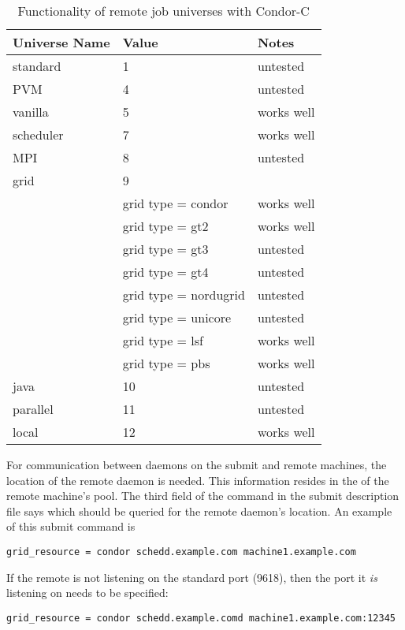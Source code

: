 \begin{center}
\begin{table}[hbt]
\begin{tabular}{|l|l|l}
\textbf{Universe Name} & \textbf{Value} & \textbf{Notes}\\ \hline \hline
standard  & 1 & untested \\ \hline
PVM       & 4 & untested \\ \hline
vanilla   & 5 & works well \\ \hline
scheduler & 7 & works well \\ \hline
MPI       & 8 & untested \\ \hline
grid      & 9 & \\
 & grid type = condor & works well \\
 & grid type = gt2  & works well \\
 & grid type = gt3 & untested \\
 & grid type = gt4 & untested \\ 
 & grid type = nordugrid & untested \\ 
 & grid type = unicore & untested \\
 & grid type = lsf & works well \\
 & grid type = pbs & works well \\ \hline
java & 10 & untested \\ \hline
parallel & 11 & untested \\ \hline
local & 12 & works well \\ \hline
\end{tabular}
\caption{\label{working-remote-universes}Functionality of remote job universes with Condor-C}
\end{table}
\end{center}

For communication between  daemons on the submit
and remote machines,
the location of the remote  daemon is needed.
This information resides in the  of the remote
machine's pool.
The third field of the  command in the submit description file
says which  should be queried for the remote 
daemon's location.
An example of this submit command is
\footnotesize
\begin{verbatim}
grid_resource = condor schedd.example.com machine1.example.com
\end{verbatim}
\normalsize
If the remote  is not listening on the standard port
(9618), then the port it \emph{is} listening on needs to be specified:
\footnotesize
\begin{verbatim}
grid_resource = condor schedd.example.comd machine1.example.com:12345
\end{verbatim}
\normalsize

